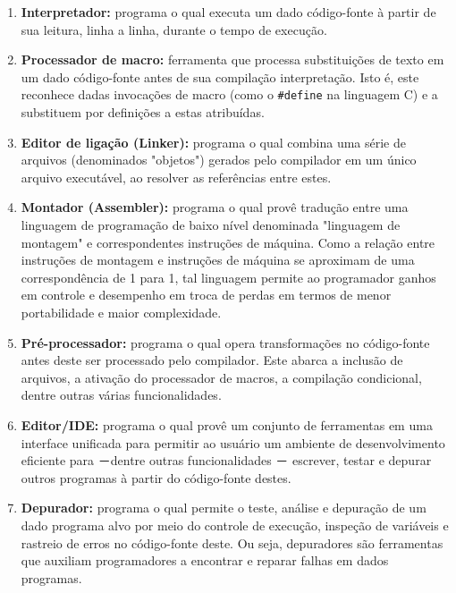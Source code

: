   {
	\begin{enumerate}
		\item \textbf{Interpretador:} programa o qual executa um dado
		      código-fonte à partir de sua leitura, linha a linha, durante o
		      tempo de execução.
		\item \textbf{Processador de macro:} ferramenta que processa
		      substituições de texto em um dado código-fonte antes de sua
		      compilação interpretação. Isto é, este reconhece dadas invocações de
		      macro (como o \texttt{#define} na linguagem C) e a substituem por
		      definições a estas atribuídas.
		\item \textbf{Editor de ligação (Linker):} programa o qual combina uma
		      série de arquivos (denominados "objetos") gerados pelo compilador em
		      um único arquivo executável, ao resolver as referências entre estes.
		\item \textbf{Montador (Assembler):} programa o qual provê tradução
		      entre uma linguagem de programação de baixo nível denominada
		      "linguagem de montagem" e correspondentes instruções de máquina.
		      Como a relação entre instruções de montagem e instruções de máquina
		      se aproximam de uma correspondência de 1 para 1, tal linguagem
		      permite ao programador ganhos em controle e desempenho em troca de
		      perdas em termos de menor portabilidade e maior complexidade.
		\item \textbf{Pré-processador:} programa o qual opera transformações no
		      código-fonte antes deste ser processado pelo compilador. Este
		      abarca a inclusão de arquivos, a ativação do processador de macros,
		      a compilação condicional, dentre outras várias funcionalidades.
		\item \textbf{Editor/IDE:} programa o qual provê um conjunto de
		      ferramentas em uma interface unificada para permitir ao usuário um
		      ambiente de desenvolvimento eficiente para －dentre outras
		      funcionalidades － escrever, testar e depurar outros programas à
		      partir do código-fonte destes.
		\item \textbf{Depurador:} programa o qual permite o teste, análise e
		      depuração de um dado programa alvo por meio do controle de execução,
		      inspeção de variáveis e rastreio de erros no código-fonte deste.
		      Ou seja, depuradores são ferramentas que  auxiliam programadores
		      a encontrar e reparar falhas em dados programas.
	\end{enumerate}
}

